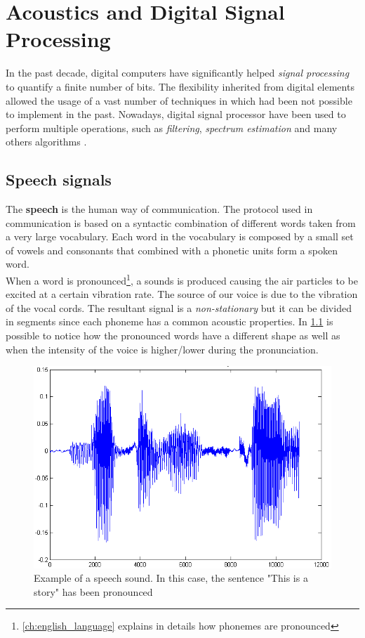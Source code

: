 \chapter{Acoustics and Digital Signal Processing}
\label{ch:speech analysis}
In the past decade, digital computers have significantly helped \textit{signal processing} to quantify a finite number of bits. The flexibility inherited from digital elements allowed the usage of a vast number of techniques in which had been not possible to implement in the past. Nowadays, digital signal processor have been used to perform multiple operations, such as \textit{filtering}, \textit{spectrum estimation} and many others algorithms \cite{orfanidis1995introduction}.


\section{Speech signals}
\label{sec:speech_signals}
The \textbf{speech} is the human way of communication. The protocol used in communication is based on a syntactic combination of different words taken from a very large vocabulary. Each word in the vocabulary is composed by a small set of vowels and consonants that combined with a phonetic units form a spoken word. \\
\noindent When a word is pronounced\footnote{\ref{ch:english_language} explains in details how phonemes are pronounced}, a sounds is produced causing the air particles to be excited at a certain vibration rate. The source of our voice is due to the vibration of the vocal cords. The resultant signal is a \textit{non-stationary} but it can be divided in segments since each phoneme has a common acoustic properties. In \ref{fig:ex_sound_wave} is possible to notice how the pronounced words have a different shape as well as when the intensity of the voice is higher/lower during the pronunciation.
 
\begin{figure}[!ht]
	\centering
	\includegraphics[scale=0.4]{Figures/ex_speech.png}
	\caption{Example of a speech sound. In this case, the sentence "This is a story" has been pronounced \cite{ex_speech_image}}
	\label{fig:ex_sound_wave}
\end{figure}

